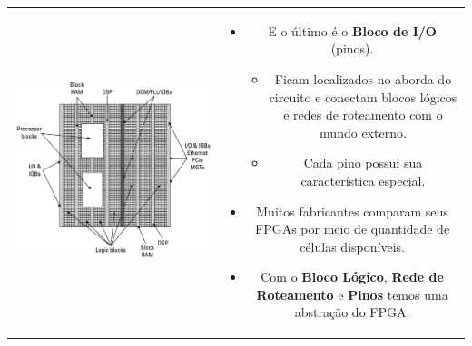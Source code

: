 \documentclass[aspectratio=169]{beamer}
\begin{document}
	\begin{frame}%
		\begin{tabular}{cc}
			\begin{minipage}{0.5\textwidth}
				\includegraphics[height=0.92\textheight]{img/print/abstracao.png}
			\end{minipage}
			&
			\begin{minipage}{0.5\textwidth}
				\begin{itemize}
					\setlength\itemsep{1.5em}
					\item E o último é o \textbf{Bloco de I/O} (pinos).
					\begin{itemize}
						\item Ficam localizados no aborda do circuito e conectam blocos lógicos e redes de roteamento com o mundo externo.
						\item Cada pino possui sua característica especial.
					\end{itemize}
					
					\item Muitos fabricantes comparam seus FPGAs por meio de quantidade de células disponíveis.
					
					\item Com o \textbf{Bloco Lógico}, \textbf{Rede de Roteamento} e \textbf{Pinos} temos uma abstração do FPGA.
				\end{itemize}
			\end{minipage}
		\end{tabular}
	\end{frame}
	
\end{document}
